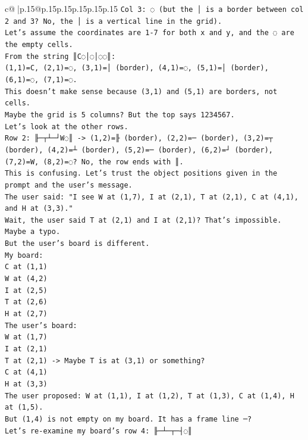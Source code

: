 \documentclass{article}
\begin{document}
{\begin{supertabular}{c@{$\;$}|p{.15\linewidth}@{}p{.15\linewidth}p{.15\linewidth}p{.15\linewidth}p{.15\linewidth}p{.15\linewidth}}
{{{\texttt{Col 3: ◌ (but the │ is a border between col 2 and 3? No, the │ is a vertical line in the grid).} \\
\texttt{Let's assume the coordinates are 1{-}7 for both x and y, and the ◌ are the empty cells.} \\
\texttt{From the string ║C◌│◌│◌◌║:} \\
\texttt{(1,1)=C, (2,1)=◌, (3,1)=│ (border), (4,1)=◌, (5,1)=│ (border), (6,1)=◌, (7,1)=◌.} \\
\texttt{This doesn't make sense because (3,1) and (5,1) are borders, not cells.} \\
\texttt{Maybe the grid is 5 columns? But the top says 1234567.} \\
\texttt{Let's look at the other rows.} \\
\texttt{Row 2: ╟─┬┴─┘W◌║ {-}> (1,2)=╟ (border), (2,2)=─ (border), (3,2)=┬ (border), (4,2)=┴ (border), (5,2)=─ (border), (6,2)=┘ (border), (7,2)=W, (8,2)=◌? No, the row ends with ║.} \\
\texttt{This is confusing. Let's trust the object positions given in the prompt and the user's message.} \\
\texttt{The user said: "I see W at (1,7), I at (2,1), T at (2,1), C at (4,1), and H at (3,3)."} \\
\texttt{Wait, the user said T at (2,1) and I at (2,1)? That's impossible. Maybe a typo.} \\
\texttt{But the user's board is different.} \\
\texttt{My board:} \\
\texttt{C at (1,1)} \\
\texttt{W at (4,2)} \\
\texttt{I at (2,5)} \\
\texttt{T at (2,6)} \\
\texttt{H at (2,7)} \\
\texttt{The user's board:} \\
\texttt{W at (1,7)} \\
\texttt{I at (2,1)} \\
\texttt{T at (2,1) {-}> Maybe T is at (3,1) or something?} \\
\texttt{C at (4,1)} \\
\texttt{H at (3,3)} \\
\texttt{The user proposed: W at (1,1), I at (1,2), T at (1,3), C at (1,4), H at (1,5).} \\
\texttt{But (1,4) is not empty on my board. It has a frame line ─?} \\
\texttt{Let's re{-}examine my board's row 4: ╟─┴─┬─┤◌║} \\
}}}
\end{supertabular}}
\end{document}
